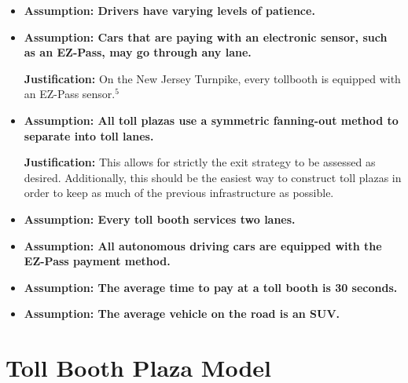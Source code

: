 \documentclass{article}
\begin{document}
\begin{itemize}
\item \textbf{Assumption: Drivers have varying levels of patience.}

\item \textbf{Assumption: Cars that are paying with an electronic sensor, such as an EZ-Pass, may go through any lane.}

\noindent \textbf{Justification: } On the New Jersey Turnpike, every tollbooth is equipped with an EZ-Pass sensor.$^{\text{5}}$

\item \textbf{Assumption: All toll plazas use a symmetric fanning-out method to separate into toll lanes.}

\noindent \textbf{Justification: } This allows for strictly the exit strategy to be assessed as desired. Additionally, this should be the easiest way to construct toll plazas in order to keep as much of the previous infrastructure as possible.

\item \textbf{Assumption: Every toll booth services two lanes.}

\item \textbf{Assumption: All autonomous driving cars are equipped with the EZ-Pass payment method.}

\item \textbf{Assumption: The average time to pay at a toll booth is 30 seconds.}

\item \textbf{Assumption: The average vehicle on the road is an SUV.}


\end{itemize}

\section{Toll Booth Plaza Model}
\end{document}

